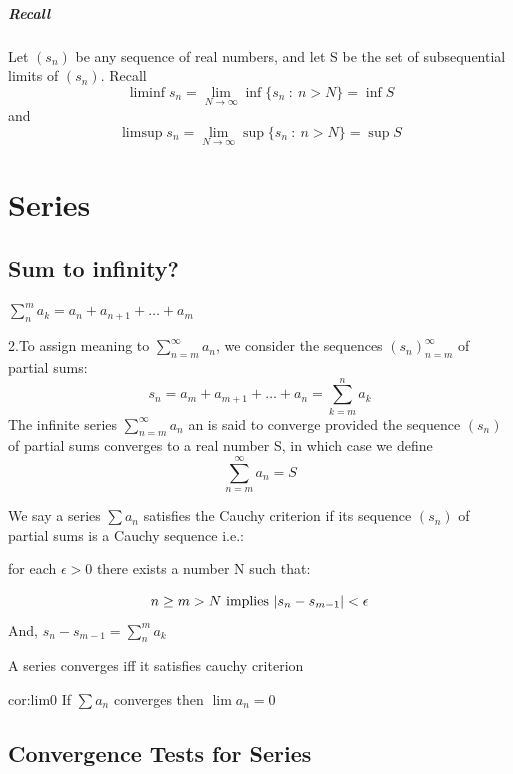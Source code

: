 \documentclass{notes}
\begin{document}
\paragraph{Recall }
Let $(s_n)$ be any sequence of real numbers, and let S be the set of
subsequential limits of $(s_n)$. Recall
$$\liminf s_n  = \lim_{N\to \infty} \inf \{s_n\ :\ n>N\} = \inf S$$
and
$$\limsup s_n  = \lim_{N\to \infty} \sup \{s_n\ :\ n>N\} = \sup S$$
\paragraph{}

	\chapter{Series}
\section{Sum to infinity?}
\begin{definition}{}
	 $\sum_{n}^{m} a_k= a_n+a_{n+1}+\ldots + a_m$
	
	2.To assign meaning to $\sum_{n=m}^{\infty} a_n$, we consider the sequences $(s_n)_{n=m}^{\infty}$
	of partial sums:
	$$s_n = a_m + a_{m+1} + \ldots + a_n = \sum_{k=m}^{n} a_k$$
	The infinite series $\sum_{n=m}^{\infty} a_n$ an is said to converge provided the sequence
	$(s_n)$ of partial sums converges to a real number S, in which case we
	define $$\sum_{n=m}^{\infty} a_n =  S$$
\end{definition}


\begin{definition}{}
	We say a series $\sum a_n$ satisfies the Cauchy criterion if its sequence
	$(s_n)$ of partial sums is a Cauchy sequence i.e.:
	
	
	for each $\epsilon > 0$ there exists a number N such that:
	
	$$n \geq m>N\ \text{implies}\ \abs{s_n - s_{m-1} }<\epsilon$$
	And, $s_n - s_{m-1} = \sum_{n}^{m} a_k$
	
	
	A series converges iff it satisfies cauchy criterion
\end{definition}
\begin{corollary}{cor:lim0}
	If $\sum a_n$ converges then $\lim a_n = 0$
\end{corollary}

\section{Convergence Tests for Series}
\end{document}
